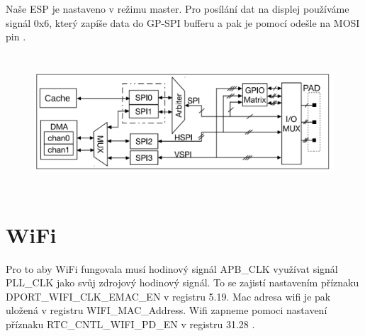 Naše ESP je nastaveno v režimu master. Pro posílání dat na displej používáme signál 0x6, který zapíše data do GP-SPI bufferu a pak je pomocí odešle na MOSI pin \cite{esp}.
\begin{figure}[h]%
  \centering
  \includegraphics[width=5in,height=2in]{img/spi.png}\\[1pt]
  \label{fig:spiSchema}
\end{figure} 


\section{WiFi}
Pro to aby WiFi fungovala musí hodinový signál APB\_CLK využívat signál PLL\_CLK jako svůj zdrojový hodinový signál. To se zajistí nastavením příznaku DPORT\_WIFI\_CLK\_EMAC\_EN v registru 5.19. Mac adresa wifi je pak uložená v registru WIFI\_MAC\_Address. Wifi zapneme pomoci nastavení příznaku RTC\_CNTL\_WIFI\_PD\_EN v registru 31.28 \cite{esp}.


